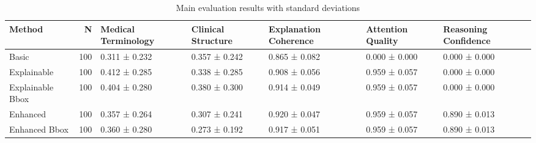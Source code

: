 \begin{table}
\caption{Main evaluation results with standard deviations}
\label{tab:main_results}
\begin{tabular}{lrlllll}
\toprule
Method & N & Medical Terminology & Clinical Structure & Explanation Coherence & Attention Quality & Reasoning Confidence \\
\midrule
Basic & 100 & 0.311 ± 0.232 & 0.357 ± 0.242 & 0.865 ± 0.082 & 0.000 ± 0.000 & 0.000 ± 0.000 \\
Explainable & 100 & 0.412 ± 0.285 & 0.338 ± 0.285 & 0.908 ± 0.056 & 0.959 ± 0.057 & 0.000 ± 0.000 \\
Explainable Bbox & 100 & 0.404 ± 0.280 & 0.380 ± 0.300 & 0.914 ± 0.049 & 0.959 ± 0.057 & 0.000 ± 0.000 \\
Enhanced & 100 & 0.357 ± 0.264 & 0.307 ± 0.241 & 0.920 ± 0.047 & 0.959 ± 0.057 & 0.890 ± 0.013 \\
Enhanced Bbox & 100 & 0.360 ± 0.280 & 0.273 ± 0.192 & 0.917 ± 0.051 & 0.959 ± 0.057 & 0.890 ± 0.013 \\
\bottomrule
\end{tabular}
\end{table}
